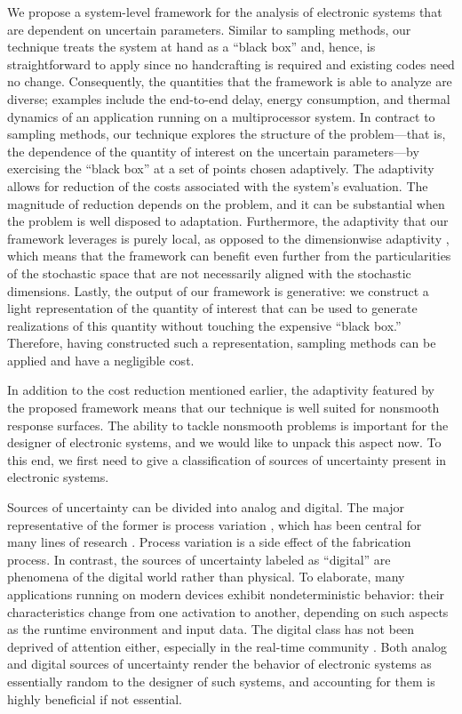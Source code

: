 We propose a system-level framework for the analysis of electronic systems that
are dependent on uncertain parameters. Similar to sampling methods, our
technique treats the system at hand as a ``black box'' and, hence, is
straightforward to apply since no handcrafting is required and existing codes
need no change. Consequently, the quantities that the framework is able to
analyze are diverse; examples include the end-to-end delay, energy consumption,
and thermal dynamics of an application running on a multiprocessor system. In
contract to sampling methods, our technique explores the structure of the
problem---that is, the dependence of the quantity of interest on the uncertain
parameters---by exercising the ``black box'' at a set of points chosen
adaptively. The adaptivity allows for reduction of the costs associated with the
system's evaluation. The magnitude of reduction depends on the problem, and it
can be substantial when the problem is well disposed to adaptation. Furthermore,
the adaptivity that our framework leverages is purely local, as opposed to the
dimensionwise adaptivity \cite{klimke2006}, which means that the framework can
benefit even further from the particularities of the stochastic space that are
not necessarily aligned with the stochastic dimensions. Lastly, the output of
our framework is generative: we construct a light representation of the quantity
of interest that can be used to generate realizations of this quantity without
touching the expensive ``black box.'' Therefore, having constructed such a
representation, sampling methods can be applied and have a negligible cost.

In addition to the cost reduction mentioned earlier, the adaptivity featured by
the proposed framework means that our technique is well suited for nonsmooth
response surfaces. The ability to tackle nonsmooth problems is important for the
designer of electronic systems, and we would like to unpack this aspect now. To
this end, we first need to give a classification of sources of uncertainty
present in electronic systems.

Sources of uncertainty can be divided into analog and digital. The major
representative of the former is process variation \cite{srivastava2005}, which
has been central for many lines of research \cite{bhardwaj2008, juan2012,
lee2013, ukhov2014, ukhov2015}. Process variation is a side effect of the
fabrication process. In contrast, the sources of uncertainty labeled as
``digital'' are phenomena of the digital world rather than physical. To
elaborate, many applications running on modern devices exhibit nondeterministic
behavior: their characteristics change from one activation to another, depending
on such aspects as the runtime environment and input data. The digital class has
not been deprived of attention either, especially in the real-time community
\cite{quinton2012, diaz2002, santinelli2011, yang2013, tanasa2015}. Both analog
and digital sources of uncertainty render the behavior of electronic systems as
essentially random to the designer of such systems, and accounting for them is
highly beneficial if not essential.

